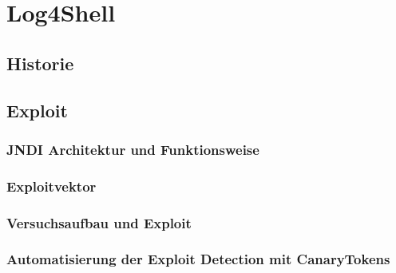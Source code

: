 

\section{Log4Shell}\label{sec:log4shell}
\subsection{Historie}\label{subsec:historie}
\subsection{Exploit}\label{subsec:exploit}
\subsubsection{JNDI Architektur und Funktionsweise}
\subsubsection{Exploitvektor}
\subsubsection{Versuchsaufbau und Exploit}
\subsubsection{Automatisierung der Exploit Detection mit CanaryTokens}


